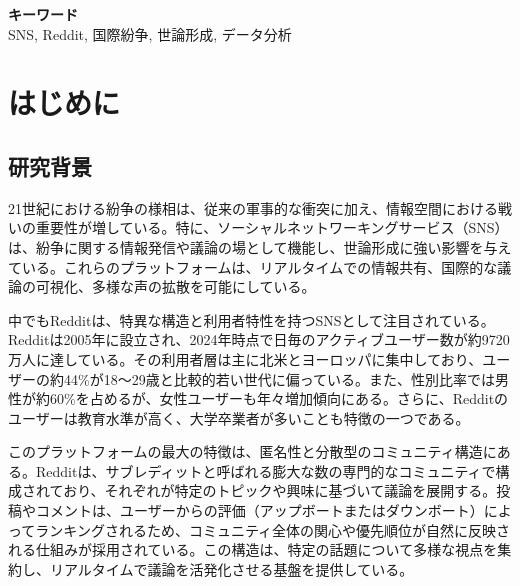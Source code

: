 \documentclass[11pt, a4j]{jreport}
\begin{document}
    \noindent
    {\Large \textbf{キーワード}} \\[5mm]
    SNS, Reddit, 国際紛争, 世論形成, データ分析

    {\makeatletter
    \let\ps@jpl@in\ps@empty
    \makeatother
    \pagestyle{empty}
    \tableofcontents
    \clearpage}
    \pagestyle{plain}
    \lhead{\rightmark}
    \renewcommand{\chaptermark}[1]{\markboth{第\ \normalfont\thechapter\ 章~~#1}{}}

    \chapter{はじめに} %
    \setcounter{page}{1} %

    \section{研究背景}

    21世紀における紛争の様相は、従来の軍事的な衝突に加え、情報空間における戦いの重要性が増している。特に、ソーシャルネットワーキングサービス（SNS）は、紛争に関する情報発信や議論の場として機能し、世論形成に強い影響を与えている。これらのプラットフォームは、リアルタイムでの情報共有、国際的な議論の可視化、多様な声の拡散を可能にしている。

    中でもRedditは、特異な構造と利用者特性を持つSNSとして注目されている。Redditは2005年に設立され、2024年時点で日毎のアクティブユーザー数が約9720万人に達している\citep{reddit2024third-quater-results}。その利用者層は主に北米とヨーロッパに集中しており\citep{statista2024reddit-country}、ユーザーの約44\%が18～29歳と比較的若い世代に偏っている\citep{statista2024reddit-age}。また、性別比率では男性が約60\%を占めるが、女性ユーザーも年々増加傾向にある\citep{statista2024reddit-gender}。さらに、Redditのユーザーは教育水準が高く、大学卒業者が多いことも特徴の一つである\citep{pew2024reddit-educated}。

    このプラットフォームの最大の特徴は、匿名性と分散型のコミュニティ構造にある。Redditは、サブレディットと呼ばれる膨大な数の専門的なコミュニティで構成されており、それぞれが特定のトピックや興味に基づいて議論を展開する。投稿やコメントは、ユーザーからの評価（アップボートまたはダウンボート）によってランキングされるため、コミュニティ全体の関心や優先順位が自然に反映される仕組みが採用されている。この構造は、特定の話題について多様な視点を集約し、リアルタイムで議論を活発化させる基盤を提供している。
\end{document}
